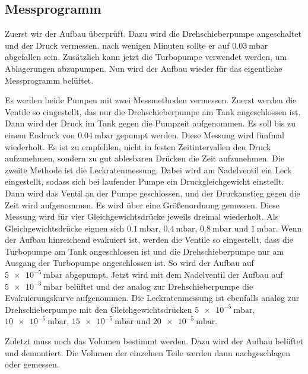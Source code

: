 \subsection{Messprogramm}
Zuerst wir der Aufbau überprüft. Dazu wird die Drehschieberpumpe angeschaltet und der Druck vermessen. nach wenigen Minuten sollte er auf
$\SI{0.03}{\milli \bar}$ abgefallen sein. Zusätzlich kann jetzt die Turbopumpe verwendet werden, um Ablagerungen abzupumpen. Nun wird der Aufbau wieder für das
eigentliche Messprogramm belüftet.

Es werden beide Pumpen mit zwei Messmethoden vermessen. Zuerst werden die Ventile so eingestellt, das nur die
Drehschieberpumpe am Tank angeschlossen ist. Dann wird der Druck im Tank gegen die Pumpzeit aufgenommen. Es soll bis zu einem Endruck von
$\SI{0.04}{\milli \bar}$ gepumpt werden. Diese Messung wird fünfmal wiederholt. Es ist zu empfehlen, nicht in festen Zeitintervallen den Druck aufzunehmen,
sondern zu gut ablesbaren Drücken die Zeit aufzunehmen.
Die zweite Methode ist die Leckratenmessung. Dabei wird am Nadelventil ein Leck eingestellt, sodass sich bei laufender Pumpe ein Druckgleichgewicht einstellt.
Dann wird das Ventil an der Pumpe geschlossen, und der Druckanstieg gegen die Zeit wird aufgenommen. Es wird über eine Größenordnung gemessen. Diese Messung
wird für vier Gleichgewichtsdrücke jeweils dreimal wiederholt. Als Gleichgewichtsdrücke eignen sich $\SI{0.1}{\milli \bar}$,
$\SI{0.4}{\milli \bar}$, $\SI{0.8}{\milli \bar}$ und $\SI{1}{\milli \bar}$. Wenn der Aufbau
hinreichend evakuiert ist, werden die Ventile so eingestellt, dass die Turbopumpe am Tank angeschlossen ist und die Drehschieberpumpe nur am Ausgang der
Turbopumpe angeschlossen ist. So wird der Aufbau auf $\SI{5e-5}{\milli \bar}$ abgepumpt. Jetzt wird mit dem Nadelventil der Aufbau auf $\SI{5e-3}{\milli \bar}$
belüftet und der analog zur Drehschieberpumpe die Evakuierungskurve aufgenommen. Die Leckratenmessung ist ebenfalls analog zur Drehschieberpumpe mit den
Gleichgewichtsdrücken $\SI{5e-5}{\milli \bar}$, $\SI{10e-5}{\milli \bar}$, $\SI{15e-5}{\milli \bar}$ und $\SI{20e-5}{\milli \bar}$.

Zuletzt muss noch das Volumen bestimmt werden. Dazu wird der Aufbau belüftet und demontiert. Die Volumen der einzelnen Teile werden dann nachgeschlagen oder
gemessen.
